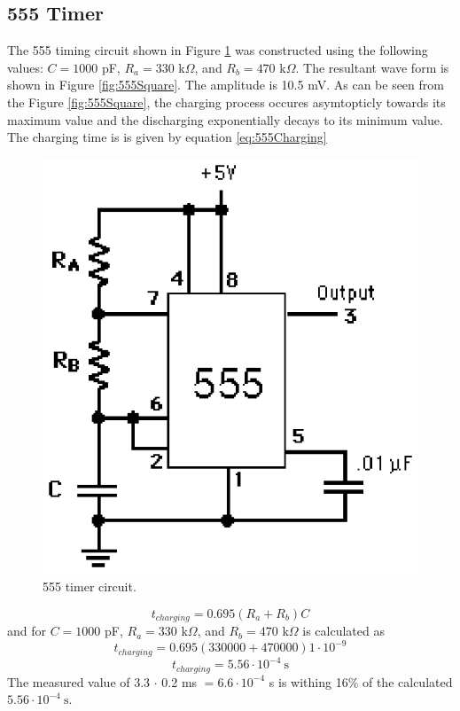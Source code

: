 \documentclass[11pt,onecolumn,letter]{article}
\begin{document}
\subsection{555 Timer}\label{subsec:555Timer}
The 555 timing circuit shown in Figure \ref{fig:555Timer} was constructed using the following values: $C = 1000$ pF, $R_a = 330$ k$\Omega$, and $R_b = 470$ k$\Omega$. The resultant wave form is shown in Figure \ref{fig:555Square}. The amplitude is 10.5 mV. As can be seen from the Figure \ref{fig:555Square}, the charging process occures asymtopticly towards its maximum value and the discharging exponentially decays to its minimum value. The charging time is is given by equation \ref{eq:555Charging}
%
%
%
\begin{figure}
\center
\includegraphics{555Timer.eps}
\caption{555 timer circuit.}\label{fig:555Timer}
\end{figure}
%
%
\begin{equation}\label{eq:555Charging}
t_{charging} = 0.695 (R_a + R_b) C
\end{equation}
and for $C = 1000$ pF, $R_a = 330$ k$\Omega$, and $R_b = 470$ k$\Omega$ is calculated as
\begin{displaymath}
t_{charging} = 0.695 (330000 + 470000) 1 \cdot 10^{-9}
\end{displaymath}
\begin{displaymath}
t_{charging} = 5.56 \cdot 10^{-4}\ \mathrm{s}
\end{displaymath}
The measured value of 3.3 $\cdot$ 0.2 ms $= 6.6 \cdot 10^{-4}$ s is withing 16\% of the calculated $5.56 \cdot 10^{-4}\ \mathrm{s}$.
\end{document}
